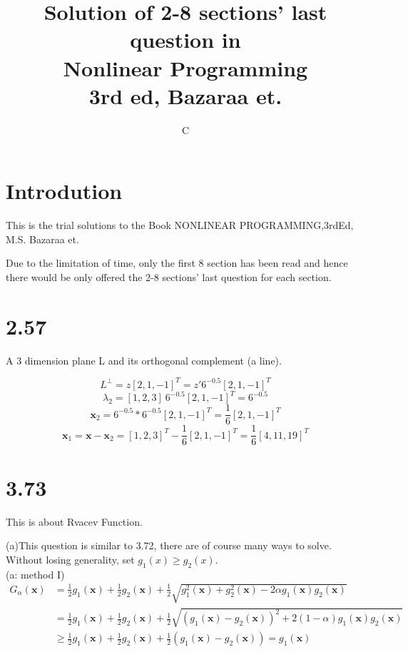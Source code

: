 \documentclass[12pt]{article}
\begin{document}
\title{Solution of 2-8 sections' last question in\\ Nonlinear Programming\\
    3rd ed, Bazaraa et.}
\author{C }
\maketitle
\section*{Introdution}
This is the trial solutions to the Book
NONLINEAR PROGRAMMING,3rdEd, M.S. Bazaraa et.

Due to the limitation of time, only the first 8 section has been read and 
hence there would be only offered the 2-8 sections' last question for each section.
\section*{2.57}
A 3 dimension plane L and its orthogonal complement (a line). 

\[
    L^{\perp}=z[2,1,-1]^T = z'6^{-0.5}[2,1,-1]^T
\]
\[
    \lambda_2= [1,2,3]\ 6^{-0.5}[2,1,-1]^T =6^{-0.5}
\]
\[
    \bm x_2= 6^{-0.5}*6^{-0.5}[2,1,-1]^T =\frac{1}{6}[2,1,-1]^T
\]
\[
    \bm x_1=\bm x-\bm x_2= [1,2,3]^T-\frac{1}{6}[2,1,-1]^T=\frac{1}{6}[4,11,19]^T
\]
\section*{3.73}
This is about Rvacev Function.

(a)This question is similar to 3.72, there are of course many ways to solve.
Without losing generality, set  $g_1(x)\geq g_2(x)$.
\\
(a: method I)\\
\begin{align*}
G_\alpha(\bm x)&=\frac{1}{2} g_1(\bm x) +\frac{1}{2} g_2(\bm x)
        +\frac{1}{2}\sqrt{ g_1^2(\bm x)+ g_2^2(\bm x)-2\alpha g_1(\bm x)g_2(\bm x) } \\
        &=\frac{1}{2} g_1(\bm x) +\frac{1}{2} g_2(\bm x)
        +\frac{1}{2}\sqrt{ ( g_1(\bm x)- g_2(\bm x) )^2+2(1-\alpha) g_1(\bm x)g_2(\bm x) } 
        \\
        &\geq\frac{1}{2} g_1(\bm x) +\frac{1}{2} g_2(\bm x)
        +\frac{1}{2} ( g_1(\bm x)- g_2(\bm x) )=g_1(\bm x)
\end{align*}
\end{document}
